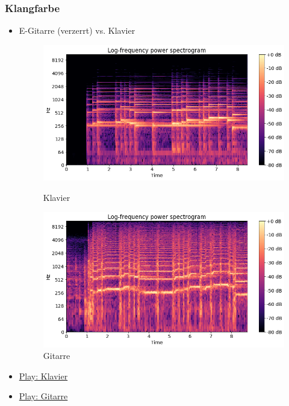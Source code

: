 \documentclass[12pt]{FSUBeamer_official}
\begin{document}
\begin{frame}
	\frametitle{Klangfarbe}
	\begin{itemize}
		\item E-Gitarre (verzerrt) vs. Klavier
		\begin{figure}[ht]
			\begin{minipage}[b]{0.46\linewidth}
				\centering
				\includegraphics[width=\textwidth]{pics/MFCC/timbre_piano.png}
				\caption{Klavier}
				\label{piano}
			\end{minipage}
			\hspace{0.1cm}
			\begin{minipage}[b]{0.46\linewidth}
				\centering
				\includegraphics[width=\textwidth]{pics/MFCC/timbre_eguitar.png}
				\caption{Gitarre}
				\label{guit}
			\end{minipage}
			\hspace{0.1cm}
		\end{figure}	
		\item \href{run:sounds/piano.mp3}{Play: Klavier}
		\item \href{run:sounds/eguitar.mp3}{Play: Gitarre}
	\end{itemize}
\end{frame}
\end{document}
